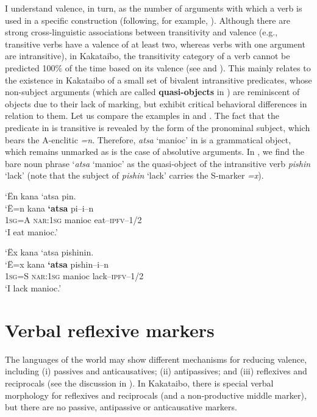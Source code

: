 \documentclass[output=paper,colorlinks,citecolor=brown,modfonts,nonflat]{langscibook}
\begin{document}
I understand valence, in turn, as the number of arguments with which a verb is used in a specific construction (following, for example, \citealt[3]{DixonAikhenvald2000}). Although there are strong cross-linguistic associations between transitivity and valence (e.g., transitive verbs have a valence of at least two, whereas verbs with one argument are intransitive), in Kakataibo, the transitivity category of a verb cannot be predicted 100\% of the time based on its valence (see \citealt{Zariquiey2017} and \citealt[217ff]{Zariquiey2018}). This mainly relates to the existence in Kakataibo of a small set of bivalent intransitive predicates, whose non-subject arguments (which are called \textbf{quasi-objects} in \citealt{Zariquiey2017}) are reminiscent of objects due to their lack of marking, but exhibit critical behavioral differences in relation to them. Let us compare the examples in  and . The fact that the predicate in  is transitive is revealed by the form of the pronominal subject, which bears the A-enclitic \textit{=n}. Therefore, \textit{atsa} ‘manioc’ in  is a grammatical object, which remains unmarked as is the case of absolutive arguments. In , we find the bare noun phrase ‘\textit{atsa} ‘manioc’ as the quasi-object of the intransitive verb \textit{pishin} ‘lack’ (note that the subject of \textit{pishin} ‘lack’ carries the S-marker \textit{=x}).

\ea%
    \label{ex:zariquiey:5}
    \glll   ‘Ën kana ‘atsa pin.\\
            ‘Ë=n  kana  \textbf{‘atsa}  pi–i–n\\
            1\textsc{sg}=A  \textsc{nar:1sg}  manioc  eat–\textsc{ipfv–1/2}\\
    \glt    ‘I eat manioc.’
\z

\ea%
    \label{ex:zariquiey:6}
    \glll   ‘Ëx kana ‘atsa pishinin.\\
            ‘Ë=x  kana  \textbf{‘atsa}  pishin–i–n\\
            1\textsc{sg}=S  \textsc{nar:1sg}  manioc  lack–\textsc{ipfv–1/2}\\
    \glt    ‘I lack manioc.’
\z

\section{Verbal reflexive markers}\label{sec:zariquiey:3}

The languages of the world may show different mechanisms for reducing valence, including (i) passives and anticausatives; (ii) antipassives; and (iii) reflexives and reciprocals (see the discussion in \citealt{DixonAikhenvald2000}). In Kakataibo, there is special verbal morphology for reflexives and reciprocals (and a non-productive middle marker), but there are no passive, antipassive or anticausative markers. 
\end{document}
